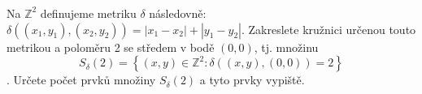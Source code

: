 \subsubsection{}
Na $\mathbb{Z}^{2}$ definujeme metriku $\delta$ následovně: $\delta
((x_{1},y_{1}),(x_{2},y_{2}))=\left | x_{1}-x_{2} \right |+\left | y_{1}-y_{2}
\right |$. Zakreslete kružnici určenou touto metrikou a poloměru 2 se středem v
bodě $(0,0)$, tj. množinu 
$$S_{\delta}(2) = \left \{ (x,y) \in \mathbb{Z}^{2}:
\delta((x,y),(0,0))=2 \right \}$$. 
Určete počet prvků množiny $S_{\delta}(2)$ a tyto prvky vypiště.
